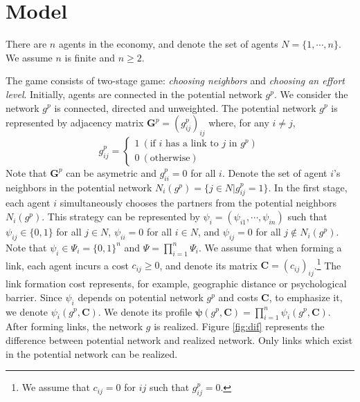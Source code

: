 \documentclass[12pt]{article}
\theoremstyle{definition}
\newcommand{\bm}[1]{\boldsymbol{#1}}
\begin{document}
\section{Model}

There are $n$ agents in the economy, and denote the set of agents $N = \{ 1, \cdots, n\}$.
We assume $n$ is finite and $n \ge 2$.

The game consists of two-stage game: {\it{choosing neighbors}} and {\it{choosing an effort level}}.
Initially, agents are connected in the potential network $g^p$.
We consider the network $g^p$ is connected, directed and unweighted.
The potential network $g^p$ is represented by adjacency matrix $\bm{G}^p = {(g_{ij}^p)}_{ij}$ where, for any $i \neq j$,
\[ g_{ij}^p =
	\begin{cases}
		1 \  (\text{if $i$ has a link to $j$ in $g^p $}) \\
		0 \  (\text{otherwise})
	\end{cases} \]
Note that $\bm{G}^p$ can be asymetric and $g_{ii}^p = 0$ for all $i$.
Denote the set of agent $i$'s neighbors in the potential network $N_i(g^p) = \{ j \in N | g_{ij}^p = 1 \}$.
In the first stage, each agent $i$ simultaneously chooses the partners from the potential neighbors $N_i(g^p)$.
This strategy can be represented by $\psi_i = (\psi_{i1}, \cdots, \psi_{in})$ such that $\psi_{ij} \in \{0, 1\}$ for all $j \in N$, $\psi_{ii}=0$ for all $i \in N$, and $\psi_{ij} = 0$ for all $j \notin N_i(g^p)$.
Note that $\psi_i \in \Psi_i = \{0, 1\}^{n}$ and $\Psi = \prod_{i=1}^n \Psi_i$.
We assume that when forming a link, each agent incurs a cost $c_{ij} \ge 0$, and denote its matrix $\bm{C} = {(c_{ij})}_{ij}$.\footnote{We assume that $c_{ij} = 0$ for $ij$ such that $g_{ij}^p = 0$.}
The link formation cost represents, for example, geographic distance or psychological barrier.
Since $\psi_i$ depends on potential network $g^p$ and costs $\bm{C}$, to emphasize it, we denote $\psi_i(g^p, \bm{C})$.
We denote its profile $\bm{\psi}(g^p, \bm{C}) = \prod_{i=1}^n \psi_i(g^p, \bm{C})$.
After forming links, the network $g$ is realized.
Figure \ref{fig:dif} represents the difference between potential network and realized network.
Only links which exist in the potential network can be realized.
\end{document}
